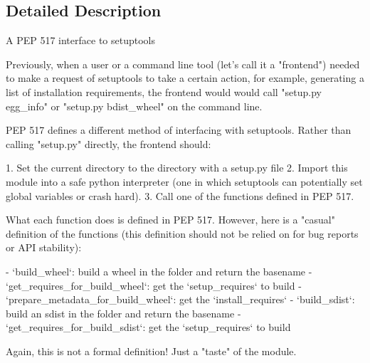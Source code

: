 \subsection{Detailed Description}
\begin{DoxyVerb}A PEP 517 interface to setuptools

Previously, when a user or a command line tool (let's call it a "frontend")
needed to make a request of setuptools to take a certain action, for
example, generating a list of installation requirements, the frontend would
would call "setup.py egg_info" or "setup.py bdist_wheel" on the command line.

PEP 517 defines a different method of interfacing with setuptools. Rather
than calling "setup.py" directly, the frontend should:

  1. Set the current directory to the directory with a setup.py file
  2. Import this module into a safe python interpreter (one in which
 setuptools can potentially set global variables or crash hard).
  3. Call one of the functions defined in PEP 517.

What each function does is defined in PEP 517. However, here is a "casual"
definition of the functions (this definition should not be relied on for
bug reports or API stability):

  - `build_wheel`: build a wheel in the folder and return the basename
  - `get_requires_for_build_wheel`: get the `setup_requires` to build
  - `prepare_metadata_for_build_wheel`: get the `install_requires`
  - `build_sdist`: build an sdist in the folder and return the basename
  - `get_requires_for_build_sdist`: get the `setup_requires` to build

Again, this is not a formal definition! Just a "taste" of the module.
\end{DoxyVerb}
 